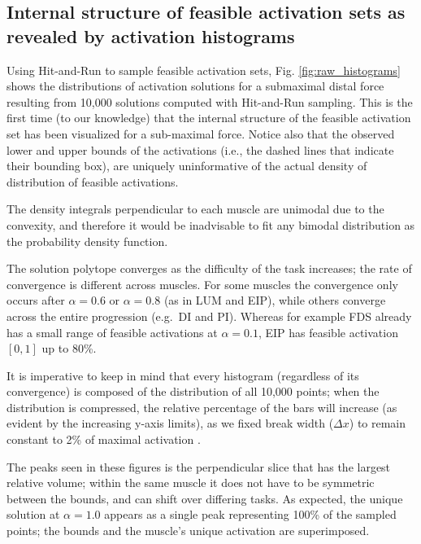 \subsection*{Internal structure of feasible activation sets as revealed by activation histograms}

Using Hit-and-Run to sample feasible activation sets, Fig. \ref{fig:raw_histograms} shows the distributions of activation solutions for a submaximal distal force resulting from 10,000 solutions computed with Hit-and-Run sampling.
This is the first time (to our knowledge) that the internal structure of the feasible activation set has been visualized for a sub-maximal force.
Notice also that the observed lower and upper bounds of the activations (i.e., the dashed lines that indicate their bounding box), are uniquely uninformative of the actual density of distribution of feasible activations.

The density integrals perpendicular to each muscle are unimodal due to the convexity\cite{ball1997elementary}, and therefore it would be inadvisable to fit any bimodal distribution as the probability density function.

The solution polytope converges as the difficulty of the task increases; the rate of convergence is different across muscles.
For some muscles the convergence only occurs after $\alpha=0.6$ or $\alpha=0.8$ (as in LUM and EIP), while others converge across the entire progression (e.g.\ DI and PI).
Whereas for example FDS already has a small range of feasible activations at $\alpha=0.1$, EIP has feasible activation $[0,1]$ up to 80\%.

It is imperative to keep in mind that every histogram (regardless of its convergence) is composed of the distribution of all 10,000 points; when the distribution is compressed, the relative percentage of the bars will increase (as evident by the increasing y-axis limits), as we fixed break width ($\Delta x$) to remain constant to 2\% of maximal activation \cite{ball1997elementary}.

The peaks seen in these figures is the perpendicular slice that has the largest relative volume; within the same muscle it does not have to be symmetric between the bounds, and can shift over differing tasks.
As expected, the unique solution at $\alpha=1.0$ appears as a single peak representing 100\% of the sampled points; the bounds and the muscle's unique activation are superimposed.

